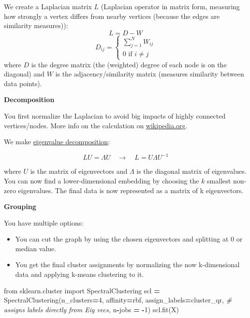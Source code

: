 \documentclass[
]{book}
\newenvironment{Shaded}{\begin{snugshade}}{\end{snugshade}}
\newcommand{\CommentTok}[1]{\textcolor[rgb]{0.56,0.35,0.01}{\textit{#1}}}
\newcommand{\DecValTok}[1]{\textcolor[rgb]{0.00,0.00,0.81}{#1}}
\newcommand{\ImportTok}[1]{#1}
\newcommand{\NormalTok}[1]{#1}
\newcommand{\OperatorTok}[1]{\textcolor[rgb]{0.81,0.36,0.00}{\textbf{#1}}}
\newcommand{\StringTok}[1]{\textcolor[rgb]{0.31,0.60,0.02}{#1}}
\begin{document}
We create a Laplacian matrix \(L\) (Laplacian operator in matrix form,
measuring how strongly a vertex differs from nearby vertices (because
the edges are similarity measures)): \[L = D - W\]
\[D_{ij} = \begin{cases}
        \sum_{j=1}^N W_{ij} \\
        0 \text{ if } i \neq j
    \end{cases}\] where \(D\) is the degree matrix (the (weighted) degree
of each node is on the diagonal) and \(W\) is the adjacency/similarity
matrix (measures similarity between data points).

\textbf{Decomposition}

You first normalize the Laplacian to avoid big impacts of highly
connected vertices/nodes. More info on the calculation on
\href{https://en.wikipedia.org/wiki/Laplacian_matrix\#Laplacian_matrix_normalization}{wikipedia.org}.

We make \protect\hyperlink{EV_Dec}{eigenvalue decomposition}:

\[L U = \Lambda U \quad \rightarrow \quad L = U \Lambda U^{-1} \]

where \(U\) is the matrix of eigenvectors and \(\Lambda\) is the diagonal
matrix of eigenvalues. You can now find a lower-dimensional embedding by
choosing the \(k\) smallest non-zero eigenvalues. The final data is now
represented as a matrix of k eigenvectors.

\textbf{Grouping}

You have multiple options:

\begin{itemize}
\item
  You can cut the graph by using the chosen eigenvectors and splitting
  at 0 or median value.
\item
  You get the final cluster assignments by normalizing the now
  k-dimensional data and applying k-means clustering to it.
\end{itemize}

\begin{Shaded}
\begin{Highlighting}[]
\ImportTok{from}\NormalTok{ sklearn.cluster }\ImportTok{import}\NormalTok{ SpectralClustering}
\NormalTok{scl }\OperatorTok{=}\NormalTok{ SpectralClustering(n\_clusters}\OperatorTok{=}\DecValTok{4}\NormalTok{,}
\NormalTok{        affinity}\OperatorTok{=}\StringTok{\textquotesingle{}rbf\textquotesingle{}}\NormalTok{,}
\NormalTok{        assign\_labels}\OperatorTok{=}\StringTok{\textquotesingle{}cluster\_qr\textquotesingle{}}\NormalTok{, }\CommentTok{\# assigns labels directly from Eig vecs,}
\NormalTok{        n}\OperatorTok{{-}}\NormalTok{jobs }\OperatorTok{=} \OperatorTok{{-}}\DecValTok{1}\NormalTok{)}
\NormalTok{scl.fit(X)}
\end{Highlighting}
\end{Shaded}
\end{document}
